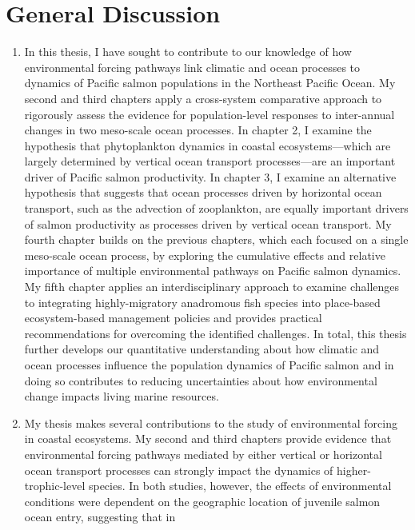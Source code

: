 \chapter{General Discussion}\label{general-discussion}

\begin{enumerate}
\def\labelenumi{\arabic{enumi}.}
\item
  In this thesis, I have sought to contribute to our knowledge of how
  environmental forcing pathways link climatic and ocean processes to
  dynamics of Pacific salmon populations in the Northeast Pacific Ocean.
  My second and third chapters apply a cross-system comparative approach
  to rigorously assess the evidence for population-level responses to
  inter-annual changes in two meso-scale ocean processes. In chapter 2,
  I examine the hypothesis that phytoplankton dynamics in coastal
  ecosystems---which are largely determined by vertical ocean transport
  processes---are an important driver of Pacific salmon productivity. In
  chapter 3, I examine an alternative hypothesis that suggests that
  ocean processes driven by horizontal ocean transport, such as the
  advection of zooplankton, are equally important drivers of salmon
  productivity as processes driven by vertical ocean transport. My
  fourth chapter builds on the previous chapters, which each focused on
  a single meso-scale ocean process, by exploring the cumulative effects
  and relative importance of multiple environmental pathways on Pacific
  salmon dynamics. My fifth chapter applies an interdisciplinary
  approach to examine challenges to integrating highly-migratory
  anadromous fish species into place-based ecosystem-based management
  policies and provides practical recommendations for overcoming the
  identified challenges. In total, this thesis further develops our
  quantitative understanding about how climatic and ocean processes
  influence the population dynamics of Pacific salmon and in doing so
  contributes to reducing uncertainties about how environmental change
  impacts living marine resources.
\item
  My thesis makes several contributions to the study of environmental
  forcing in coastal ecosystems. My second and third chapters provide
  evidence that environmental forcing pathways mediated by either
  vertical or horizontal ocean transport processes can strongly impact
  the dynamics of higher-trophic-level species. In both studies,
  however, the effects of environmental conditions were dependent on the
  geographic location of juvenile salmon ocean entry, suggesting that in

\end{enumerate}
